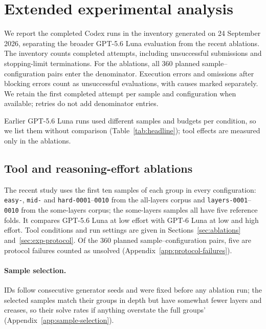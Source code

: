\section{Extended experimental analysis}
\label{app:revision-details}


We report the completed Codex runs in the inventory generated on 24 September 2026,
separating the broader GPT-5.6 Luna evaluation from the recent ablations. The inventory
counts completed attempts, including unsuccessful submissions and stopping-limit
terminations. For the ablations, all 360 planned sample--configuration pairs enter
the denominator. Execution errors and omissions after blocking errors count as
unsuccessful evaluations, with causes marked separately. We retain the first completed
attempt per sample and configuration when available; retries do not add denominator entries.


Earlier GPT-5.6 Luna runs used different samples and budgets per condition, so we list them
without comparison (Table~\ref{tab:headline}); tool effects are measured only in the ablations.

\subsection{Tool and reasoning-effort ablations}



The recent study uses the first ten samples of each group in every configuration:
\texttt{easy-}, \texttt{mid-} and \texttt{hard-0001}--\texttt{0010} from the all-layers corpus and
\texttt{layers-0001}--\texttt{0010} from the some-layers corpus; the some-layers samples all have five reference folds. It compares GPT-5.6 Luna at low effort with
GPT-6 Luna at low and high effort. Tool conditions and run settings are
given in Sections~\ref{sec:ablations} and~\ref{sec:exp-protocol}. Of the 360 planned
sample--configuration pairs, five are protocol failures counted as unsolved
(Appendix~\ref{app:protocol-failures}).

\paragraph{Sample selection.} IDs follow consecutive generator seeds and were fixed before any
ablation run; the selected samples match their groups in depth but have somewhat fewer layers and
creases, so their solve rates if anything overstate the full groups' (Appendix~\ref{app:sample-selection}).




